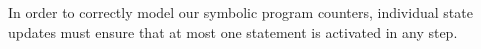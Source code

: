 In order to correctly model our symbolic program counters, individual state updates must ensure that at most one statement is activated in any step.
